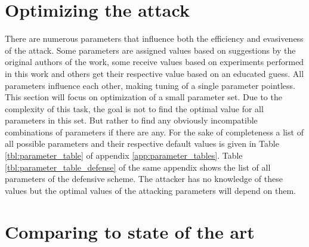 \section{Optimizing the attack}\label{sec:optimize}
There are numerous parameters that influence both the efficiency and evasiveness of the attack. Some parameters are assigned values based on suggestions by the original authors of the work, some receive values based on experiments performed in this work and others get their respective value based on an educated guess. All parameters influence each other, making tuning of a single parameter pointless.\\

This section will focus on optimization of a small parameter set. Due to the complexity of this task, the goal is not to find the optimal value for all  parameters in this set. But rather to find any obviously incompatible combinations of parameters if there are any. For the sake of completeness a list of all possible parameters and their respective default values is given in Table \ref{tbl:parameter_table} of appendix \ref{app:parameter_tables}. Table \ref{tbl:parameter_table_defense} of the same appendix shows the list of all parameters of the defensive scheme. The attacker has no knowledge of these values but the optimal values of the attacking parameters will depend on them.\\

\section{Comparing to state of the art}
